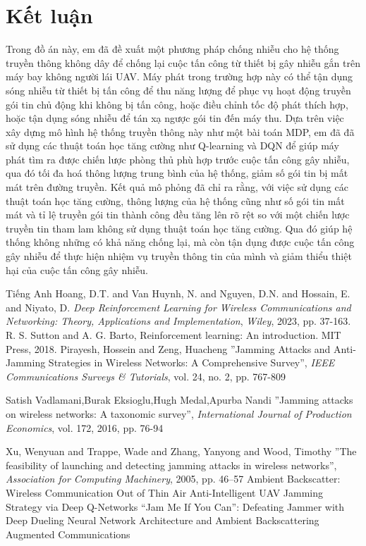 \documentclass{uetgraduation}
\begin{document}
\chapter{Kết luận}
Trong đồ án này, em đã đề xuất một phương pháp chống nhiễu cho hệ thống truyền thông không dây để chống lại cuộc tấn công từ thiết bị gây nhiễu gắn trên máy bay không người lái UAV.
Máy phát trong trường hợp này có thể tận dụng sóng nhiễu từ thiết bị tấn công để thu năng lượng để phục vụ hoạt động truyền gói tin chủ động khi không bị tấn công, hoặc điều chỉnh tốc
độ phát thích hợp, hoặc tận dụng sóng nhiễu để tán xạ ngược gói tin đến máy thu. Dựa trên việc xây dựng mô hình hệ thống truyền thông này như một bài toán MDP, em đã đã sử dụng các
thuật toán học tăng cường như
Q-learning và DQN để giúp máy phát tìm ra được chiến lược phòng thủ phù hợp trước cuộc tấn công gây nhiễu, qua đó tối đa hoá thông lượng trung bình của hệ thống, giảm số gói tin bị mất mát trên đường truyền.
Kết quả mô phỏng đã chỉ ra rằng, với việc sử dụng các thuật toán học tăng cường, thông lượng của hệ thống cũng như số gói tin mất mát và tỉ lệ truyền gói tin thành công đều tăng lên rõ
rệt so với một chiến lược truyền tin tham lam không sử dụng thuật toán học tăng cường. Qua đó giúp hệ thống không những có khả năng chống lại, mà còn tận dụng được cuộc tấn công gây nhiễu
để thực hiện nhiệm vụ truyền thông tin của mình và giảm thiểu thiệt hại của cuộc tấn công gây nhiễu.

\begin{thebibliography}{9}
\begin{bibsection}{Tiếng Anh}
    Hoang, D.T. and Van Huynh, N. and Nguyen, D.N. and Hossain, E. and Niyato, D.
    \textit{Deep Reinforcement Learning for Wireless Communications and Networking: Theory, Applications and Implementation},
    \textit{Wiley}, 2023, pp. 37-163.
    R. S. Sutton and A. G. Barto, Reinforcement learning: An introduction.
    MIT Press, 2018.
    Pirayesh, Hossein and Zeng, Huacheng
    ''Jamming Attacks and Anti-Jamming Strategies in Wireless Networks: A Comprehensive Survey'',
    \textit{IEEE Communications Surveys \& Tutorials},
    vol. 24, no. 2,
    pp. 767-809

    Satish Vadlamani,Burak Eksioglu,Hugh Medal,Apurba Nandi
    ''Jamming attacks on wireless networks: A taxonomic survey'',
    \textit{International Journal of Production Economics},
    vol. 172,
    2016,
    pp. 76-94

    Xu, Wenyuan and Trappe, Wade and Zhang, Yanyong and Wood, Timothy
    ''The feasibility of launching and detecting jamming attacks in wireless networks'',
    \textit{Association for Computing Machinery},
    2005,
    pp. 46–57
    Ambient Backscatter: Wireless Communication Out of Thin Air
    Anti-Intelligent UAV Jamming Strategy via Deep Q-Networks
    “Jam Me If You Can”: Defeating Jammer with Deep Dueling Neural Network Architecture and Ambient Backscattering Augmented Communications
\end{bibsection}
\end{thebibliography}
\end{document}
